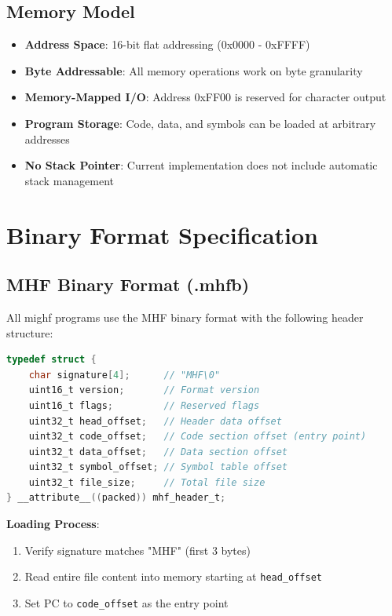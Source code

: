\documentclass[a4paper,12pt]{article}
\begin{document}
\subsection{Memory Model}
\begin{itemize}
    \item \textbf{Address Space}: 16-bit flat addressing (0x0000 - 0xFFFF)
    \item \textbf{Byte Addressable}: All memory operations work on byte granularity
    \item \textbf{Memory-Mapped I/O}: Address 0xFF00 is reserved for character output
    \item \textbf{Program Storage}: Code, data, and symbols can be loaded at arbitrary addresses
    \item \textbf{No Stack Pointer}: Current implementation does not include automatic stack management
\end{itemize}

\section{Binary Format Specification}

\subsection{MHF Binary Format (.mhfb)}
All mighf programs use the MHF binary format with the following header structure:

\begin{lstlisting}[language=C, caption=MHF Header Structure]
typedef struct {
    char signature[4];      // "MHF\0"
    uint16_t version;       // Format version
    uint16_t flags;         // Reserved flags
    uint32_t head_offset;   // Header data offset
    uint32_t code_offset;   // Code section offset (entry point)
    uint32_t data_offset;   // Data section offset
    uint32_t symbol_offset; // Symbol table offset
    uint32_t file_size;     // Total file size
} __attribute__((packed)) mhf_header_t;
\end{lstlisting}

\textbf{Loading Process}:
\begin{enumerate}
    \item Verify signature matches "MHF" (first 3 bytes)
    \item Read entire file content into memory starting at \texttt{head\_offset}
    \item Set PC to \texttt{code\_offset} as the entry point
\end{enumerate}
\end{document}
